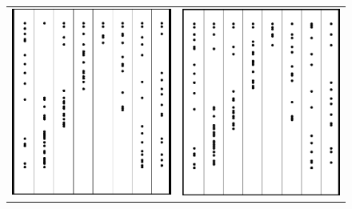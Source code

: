 \documentclass[a4paper, 11pt]{article}
\begin{document}
\begin{figure}[H]
\begin{center}
\begin{tabular}{c c}
\includegraphics[scale=0.23]{Images/4By8MidTriOne.png} & \includegraphics[scale=0.23]{Images/4By8MidTriTwo.png}

\end{tabular}
\end{center}
\end{figure}
\end{document}
